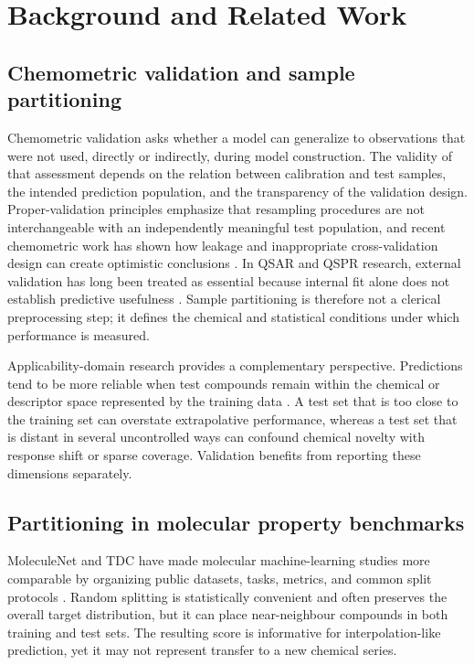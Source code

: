 \section{Background and Related Work}

\subsection{Chemometric validation and sample partitioning}

Chemometric validation asks whether a model can generalize to observations that were not used, directly or indirectly, during model construction. The validity of that assessment depends on the relation between calibration and test samples, the intended prediction population, and the transparency of the validation design. Proper-validation principles emphasize that resampling procedures are not interchangeable with an independently meaningful test population, and recent chemometric work has shown how leakage and inappropriate cross-validation design can create optimistic conclusions \citep{esbensen2010proper,kiraly2025leakage,camacho2026validation}. In QSAR and QSPR research, external validation has long been treated as essential because internal fit alone does not establish predictive usefulness \citep{tropsha2003earnest,gramatica2007principles}. Sample partitioning is therefore not a clerical preprocessing step; it defines the chemical and statistical conditions under which performance is measured.

Applicability-domain research provides a complementary perspective. Predictions tend to be more reliable when test compounds remain within the chemical or descriptor space represented by the training data \citep{netzeva2005applicability,sahigara2012applicability}. A test set that is too close to the training set can overstate extrapolative performance, whereas a test set that is distant in several uncontrolled ways can confound chemical novelty with response shift or sparse coverage. Validation benefits from reporting these dimensions separately.

\subsection{Partitioning in molecular property benchmarks}

MoleculeNet and TDC have made molecular machine-learning studies more comparable by organizing public datasets, tasks, metrics, and common split protocols \citep{wu2018moleculenet,huang2021tdc}. Random splitting is statistically convenient and often preserves the overall target distribution, but it can place near-neighbour compounds in both training and test sets. The resulting score is informative for interpolation-like prediction, yet it may not represent transfer to a new chemical series.

